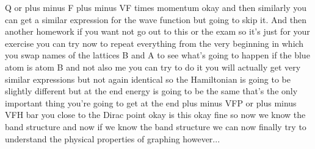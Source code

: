 Q or plus minus F plus minus VF times momentum okay and then similarly you can get a similar expression for the wave function but going to skip it.
And then another homework if you want not go out to this or the exam so it's just for your exercise you can try now to repeat everything from the very beginning in which you swap names of the lattices B and A to see what's going to happen if the blue atom is atom B and not also me you can try to do it you will actually get very similar expressions but not again identical so the Hamiltonian is going to be slightly different but at the end energy is going to be the same that's the only important thing you're going to get at the end plus minus VFP or plus minus VFH bar you close to the Dirac point okay is this okay fine so now we know the band structure and now if we know the band structure we can now finally try to understand the physical properties of graphing however...
